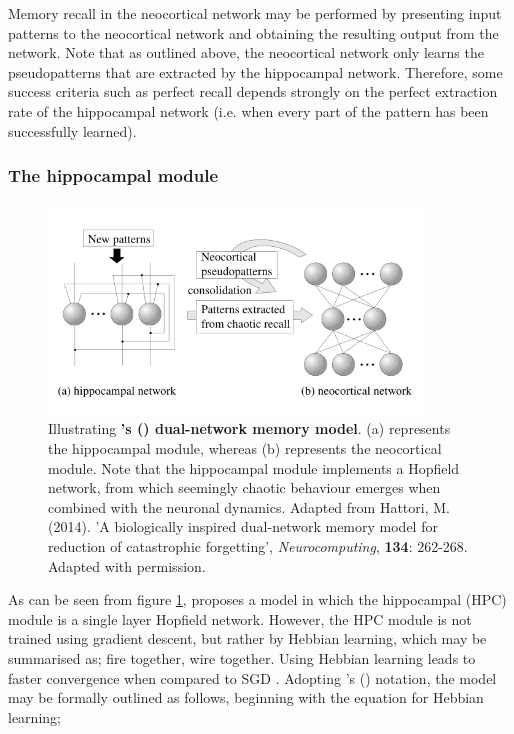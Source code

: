Memory recall in the neocortical network may be performed by presenting input patterns to the neocortical network and obtaining the resulting output from the network. Note that as outlined above, the neocortical network only learns the pseudopatterns that are extracted by the hippocampal network. Therefore, some success criteria such as perfect recall depends strongly on the perfect extraction rate of the hippocampal network (i.e. when every part of the pattern has been successfully learned).

\subsubsection{The hippocampal module}
\subsubsection{\cite{Hattori2010}}
\begin{figure}
\centering
\includegraphics[width=10cm]{fig/hattori2010_model_structure}
\caption{Illustrating \textbf{\citeauthor{Hattori2010}'s (\citeyear{Hattori2010}) dual-network memory model}. (a) represents the hippocampal module, whereas (b) represents the neocortical module. Note that the hippocampal module implements a Hopfield network, from which seemingly chaotic behaviour emerges when combined with the neuronal dynamics. Adapted from Hattori, M. (2014). 'A biologically inspired dual-network memory model for reduction of catastrophic forgetting', \textit{Neurocomputing}, \textbf{134}: 262-268. Adapted with permission.}
\label{fig:hattori2010_model_structure}
\end{figure}

As can be seen from figure \ref{fig:hattori2010_model_structure}, \cite{Hattori2010} proposes a model in which the hippocampal (HPC) module is a single layer Hopfield network. However, the HPC module is not trained using gradient descent, but rather by Hebbian learning, which may be summarised as; fire together, wire together. Using Hebbian learning leads to faster convergence when compared to SGD \citep{Hattori2010}. Adopting \citeauthor{Hattori2010}'s (\citeyear{Hattori2010}) notation, the model may be formally outlined as follows, beginning with the equation for Hebbian learning;

